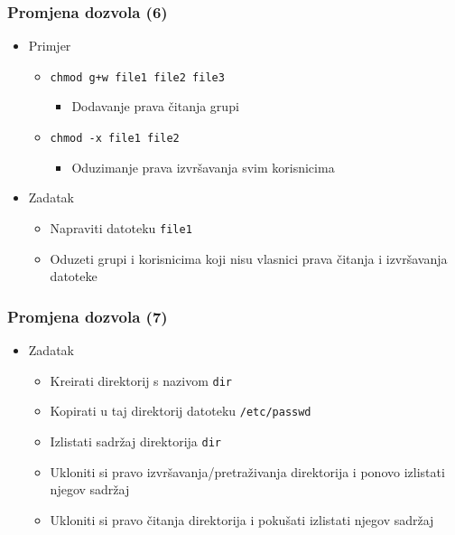 \documentclass[table,usenames,dvipsnames]{beamer}
\newcommand{\shell}[1]{\texttt{#1}}
\begin{document}
\begin{frame}[t]
\frametitle{Promjena dozvola (6)}
\begin{itemize}
  \item Primjer
  \begin{itemize}
    \item[] \shell{chmod g+w file1 file2 file3}
    \begin{itemize}
      \item Dodavanje prava čitanja grupi
    \end{itemize}
    \item[] \shell{chmod -x file1 file2}
    \begin{itemize}
      \item Oduzimanje prava izvršavanja svim korisnicima
    \end{itemize}
  \end{itemize}
  \item Zadatak
  \begin{itemize}
    \item Napraviti datoteku \shell{file1}
    \item Oduzeti grupi i korisnicima koji nisu vlasnici prava čitanja i 
          izvršavanja datoteke
  \end{itemize}
\end{itemize}
\end{frame}

\begin{frame}[t]
\frametitle{Promjena dozvola (7)}
\begin{itemize}
  \item Zadatak
  \begin{itemize}
    \item Kreirati direktorij s nazivom \shell{dir}
    \item Kopirati u taj direktorij datoteku \shell{/etc/passwd}
    \item Izlistati sadržaj direktorija \shell{dir}
    \item Ukloniti si pravo izvršavanja/pretraživanja direktorija i ponovo
          izlistati njegov sadržaj
    \item Ukloniti si pravo čitanja direktorija i pokušati izlistati njegov
          sadržaj
  \end{itemize}
\end{itemize}
\end{frame}
\end{document}
